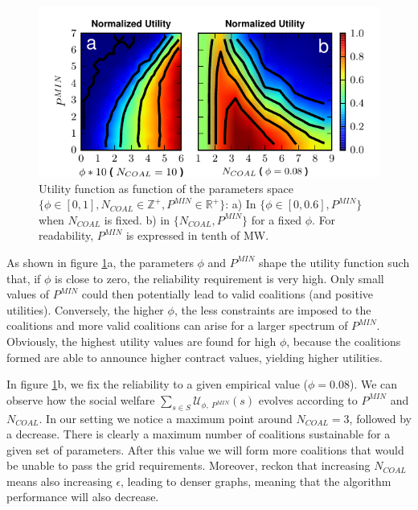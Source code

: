 \documentclass[conference]{IEEEtran}
\begin{document}
\begin{figure}
 \centering
  \includegraphics[scale=0.9]{./figure9/util}
\caption{Utility function as function of the parameters space $\{\phi \in [0,1], N_{COAL}\in \mathbb{Z}^+, P^{MIN} \in \mathbb{R}^+\}$: a) In $ \{\phi \in [0,0.6], P^{MIN}\} $ when $ N_{COAL} $ is fixed. b) in $ \{N_{COAL}, P^{MIN}\} $ for a fixed $ \phi $. For readability, $ P^{MIN} $ is expressed in tenth of MW.}
\label{Fig2}
\end{figure}

As shown in figure \ref{Fig2}a, the parameters $\phi$ and $P^{MIN}$ shape the utility function such that, if $ \phi $ is close to zero, the reliability requirement is very high. Only small values of $ P^{MIN}$ could then potentially lead to valid coalitions (and positive utilities). Conversely, the higher $\phi$, the less constraints are imposed to the coalitions and more valid coalitions can arise for a larger spectrum of $ P^{MIN}$. Obviously, the highest utility values are found for high $ \phi $, because the coalitions formed are able to announce higher contract values, yielding higher utilities. 

In figure \ref{Fig2}b, we fix the reliability to a given empirical value ($\phi = 0.08 $). We can observe how the social welfare $\sum_{s \in S} \mathcal{U}_{\phi,\ P^{MIN}}(s)$ evolves according to $P^{MIN}$ and $ N_{COAL} $. In our setting we notice a maximum point around $ N_{COAL} = 3 $, followed by a decrease. There is clearly a maximum number of coalitions sustainable for a given set of parameters. After this value we will form more coalitions that would be unable to pass the grid requirements. Moreover, reckon that increasing $ N_{COAL} $ means also increasing $ \epsilon $, leading to denser graphs, meaning that the algorithm performance will also decrease.
\end{document}
